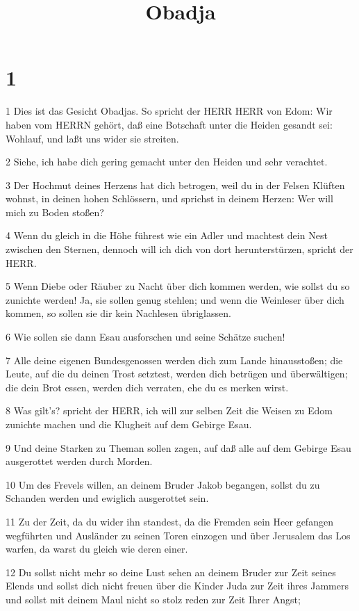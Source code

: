 

\title{Obadja}


\chapter{1}

\par 1 Dies ist das Gesicht Obadjas. So spricht der HERR HERR von Edom: Wir haben vom HERRN gehört, daß eine Botschaft unter die Heiden gesandt sei: Wohlauf, und laßt uns wider sie streiten.
\par 2 Siehe, ich habe dich gering gemacht unter den Heiden und sehr verachtet.
\par 3 Der Hochmut deines Herzens hat dich betrogen, weil du in der Felsen Klüften wohnst, in deinen hohen Schlössern, und sprichst in deinem Herzen: Wer will mich zu Boden stoßen?
\par 4 Wenn du gleich in die Höhe führest wie ein Adler und machtest dein Nest zwischen den Sternen, dennoch will ich dich von dort herunterstürzen, spricht der HERR.
\par 5 Wenn Diebe oder Räuber zu Nacht über dich kommen werden, wie sollst du so zunichte werden! Ja, sie sollen genug stehlen; und wenn die Weinleser über dich kommen, so sollen sie dir kein Nachlesen übriglassen.
\par 6 Wie sollen sie dann Esau ausforschen und seine Schätze suchen!
\par 7 Alle deine eigenen Bundesgenossen werden dich zum Lande hinausstoßen; die Leute, auf die du deinen Trost setztest, werden dich betrügen und überwältigen; die dein Brot essen, werden dich verraten, ehe du es merken wirst.
\par 8 Was gilt's? spricht der HERR, ich will zur selben Zeit die Weisen zu Edom zunichte machen und die Klugheit auf dem Gebirge Esau.
\par 9 Und deine Starken zu Theman sollen zagen, auf daß alle auf dem Gebirge Esau ausgerottet werden durch Morden.
\par 10 Um des Frevels willen, an deinem Bruder Jakob begangen, sollst du zu Schanden werden und ewiglich ausgerottet sein.
\par 11 Zu der Zeit, da du wider ihn standest, da die Fremden sein Heer gefangen wegführten und Ausländer zu seinen Toren einzogen und über Jerusalem das Los warfen, da warst du gleich wie deren einer.
\par 12 Du sollst nicht mehr so deine Lust sehen an deinem Bruder zur Zeit seines Elends und sollst dich nicht freuen über die Kinder Juda zur Zeit ihres Jammers und sollst mit deinem Maul nicht so stolz reden zur Zeit Ihrer Angst;
